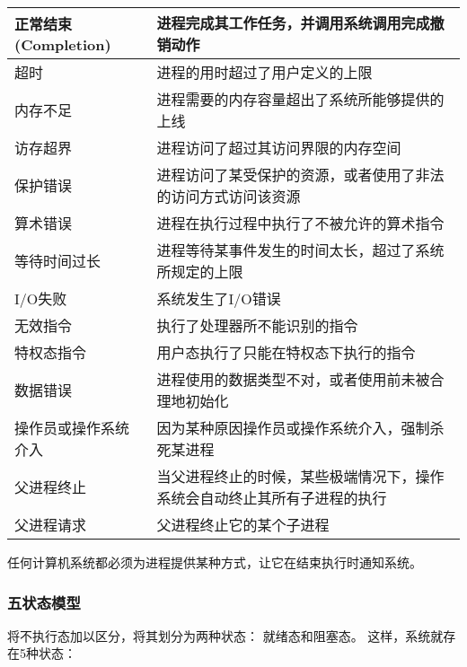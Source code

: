{{{\begin{table}[htb]
                \begin{tabular}{l|l}
                    \hline
                    正常结束(Completion) & 进程完成其工作任务，并调用系统调用完成撤销动作 \\
                    \hline
                    超时 & 进程的用时超过了用户定义的上限 \\
                    \hline
                    内存不足 & 进程需要的内存容量超出了系统所能够提供的上线 \\
                    \hline
                    访存超界 & 进程访问了超过其访问界限的内存空间 \\
                    \hline
                    保护错误 & 进程访问了某受保护的资源，或者使用了非法的访问方式访问该资源 \\
                    \hline
                    算术错误 & 进程在执行过程中执行了不被允许的算术指令 \\
                    \hline
                    等待时间过长 & 进程等待某事件发生的时间太长，超过了系统所规定的上限 \\
                    \hline
                    I/O失败 & 系统发生了I/O错误 \\
                    \hline
                    无效指令 & 执行了处理器所不能识别的指令 \\
                    \hline
                    特权态指令 & 用户态执行了只能在特权态下执行的指令 \\
                    \hline
                    数据错误 & 进程使用的数据类型不对，或者使用前未被合理地初始化 \\
                    \hline
                    操作员或操作系统介入 & 因为某种原因操作员或操作系统介入，强制杀死某进程 \\
                    \hline
                    父进程终止 & 当父进程终止的时候，某些极端情况下，操作系统会自动终止其所有子进程的执行 \\
                    \hline
                    父进程请求 & 父进程终止它的某个子进程 \\
                    \hline
                \end{tabular}
            \end{table}

            任何计算机系统都必须为进程提供某种方式，让它在结束执行时通知系统。
        }

        \subsubsection{五状态模型}
        {
            将不执行态加以区分，将其划分为两种状态：
            就绪态和阻塞态。
            这样，系统就存在5种状态：

}}}
